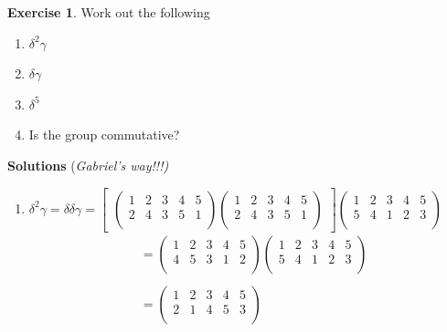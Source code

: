 \documentclass[11pt,a4paper]{article}
\theoremstyle{definition}
\newtheorem{exe}[thm]{Exercise}
\begin{document}
\begin{exe}
Work out the following
\begin{enumerate}
\item[(a)] $\delta^2 \gamma$
\item[(b)] $\delta \gamma$
\item[(c)] $\delta^5$
\item[(d)] Is the group commutative?\\
\end{enumerate}





\pagebreak
\textbf{Solutions} (\textit{Gabriel's way!!!)}
\begin{enumerate}
\item[(a)] $\delta^2 \gamma = \delta \delta \gamma = \begin{bmatrix}
\begin{pmatrix}
1 & 2 & 3 & 4 & 5\\
2 & 4 & 3 & 5 & 1\\
\end{pmatrix}\begin{pmatrix}
1 & 2 & 3 & 4 & 5\\
2 & 4 & 3 & 5 & 1\\
\end{pmatrix}
\end{bmatrix}\begin{pmatrix}
1 & 2 & 3 & 4 & 5\\
5 & 4 & 1 & 2 & 3\\
\end{pmatrix}$
\begin{align*}
&= \begin{pmatrix}
1  & 2 & 3 & 4 & 5\\
4 & 5 & 3 & 1 & 2\\
\end{pmatrix}\begin{pmatrix}
1 & 2 & 3 & 4 & 5\\
5 & 4 & 1 & 2 & 3\\
\end{pmatrix}\\\\ 
& = \begin{pmatrix}
1 & 2 & 3 & 4 & 5\\
2 & 1 & 4 & 5 & 3\\
\end{pmatrix}
\end{align*}




\end{enumerate}
\end{exe}
\end{document}
